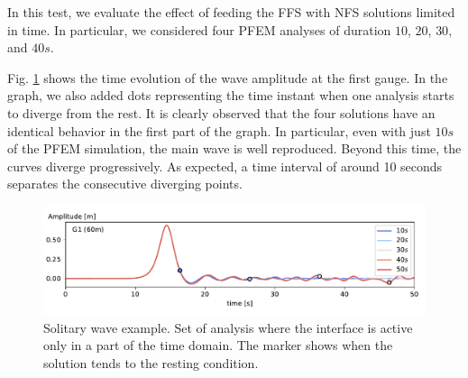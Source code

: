 In this test, we evaluate the effect of feeding the FFS with NFS solutions limited in time. In particular, we considered four PFEM analyses of duration $10$, $20$, $30$, and $40s$.

Fig. \ref{solitary_wave_time_convergence} shows the time evolution of the wave amplitude at the first gauge. In the graph, we also added dots representing the time instant when one analysis starts to diverge from the rest. It is clearly observed that the four solutions have an identical behavior in the first part of the graph. In particular, even with just $10s$ of the PFEM simulation, the main wave is well reproduced. Beyond this time, the curves diverge progressively. As expected, a time interval of around 10 seconds separates the consecutive diverging points.

\begin{figure} [htb]
    \centering
    \includegraphics[width=\textwidth]{img/coupling/solitary_wave_time_convergence.pdf}
    \caption{Solitary wave example. Set of analysis where the interface is active only in a part of the time domain. The marker shows when the solution tends to the resting condition.}
    \label{solitary_wave_time_convergence}
\end{figure}




